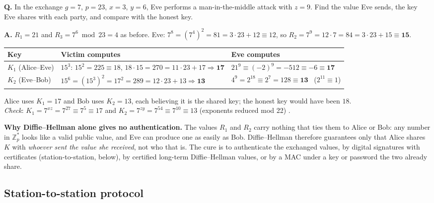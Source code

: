 \begin{worked}
\textbf{Q.} In the exchange $g = 7$, $p = 23$, $x = 3$, $y = 6$, Eve performs a man-in-the-middle attack with $z = 9$. Find the value Eve sends, the key Eve shares with each party, and compare with the honest key.

\textbf{A.} $R_1 = 21$ and $R_3 = 7^6 \bmod 23 = 4$ as before. Eve: $7^8 = (7^4)^2 = 81 = 3 \cdot 23 + 12 \equiv 12$, so $R_2 = 7^9 = 12 \cdot 7 = 84 = 3 \cdot 23 + 15 \equiv \mathbf{15}$.
\begin{center}\small
\begin{tabular}{@{}lll@{}}
\toprule
Key & Victim computes & Eve computes\\
\midrule
$K_1$ (Alice--Eve) & $15^3$: $15^2 = 225 \equiv 18$, $18 \cdot 15 = 270 = 11 \cdot 23 + 17 \Rightarrow \mathbf{17}$ & $21^9 \equiv (-2)^9 = -512 \equiv -6 \equiv \mathbf{17}$\\
$K_2$ (Eve--Bob) & $15^6 = (15^3)^2 = 17^2 = 289 = 12 \cdot 23 + 13 \Rightarrow \mathbf{13}$ & $4^9 = 2^{18} \equiv 2^7 = 128 \equiv \mathbf{13}$ \ ($2^{11} \equiv 1$)\\
\bottomrule
\end{tabular}
\end{center}
Alice uses $K_1 = 17$ and Bob uses $K_2 = 13$, each believing it is the shared key; the honest key would have been $18$.\\
\emph{Check}: $K_1 = 7^{xz} = 7^{27} \equiv 7^{5} \equiv 17$ and $K_2 = 7^{zy} = 7^{54} \equiv 7^{10} \equiv 13$ (exponents reduced mod 22) \checkmark.
\end{worked}

\textbf{Why Diffie--Hellman alone gives no authentication.} The values $R_1$ and $R_2$ carry nothing that ties them to Alice or Bob: any number in $\mathbb{Z}_p^*$ looks like a valid public value, and Eve can produce one as easily as Bob. Diffie--Hellman therefore guarantees only that Alice shares $K$ with \emph{whoever sent the value she received}, not who that is. The cure is to authenticate the exchanged values, by digital signatures with certificates (station-to-station, below), by certified long-term Diffie--Hellman values, or by a MAC under a key or password the two already share.

\subsection{Station-to-station protocol \new}

